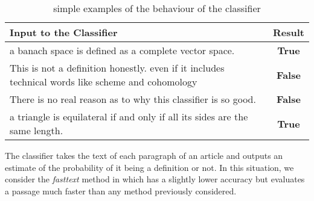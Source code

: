 \documentclass[a4paper]{easychair}
\begin{document}
\begin{table}[h]
    \begin{center}
    \begin{tabular}{|p{}|c|}
        \hline
        \hline
        \textbf{Input to the Classifier} & \textbf{Result} \\
        \hline
        \hline
        a banach space is defined as a complete vector space. & \textbf{True}\\
        \hline
        This is not a definition honestly. even if it includes technical words like scheme and cohomology & \textbf{False} \\
        \hline
        There is no real reason as to why this classifier is so good. & \textbf{False}\\
        \hline
        a triangle is equilateral if and only if all its sides are the same length. & \textbf{True}\\
        \hline
    \end{tabular}
    \caption{\label{sanity}simple examples of the behaviour of the classifier}
    \end{center} 
\end{table}

The classifier takes the text of each paragraph of an article and outputs an estimate of the probability of it being a definition or not. In this situation, we consider the \textit{fasttext} method in \cite{bagof} which has a slightly lower accuracy but evaluates a passage much faster than any method previously considered.
\end{document}
